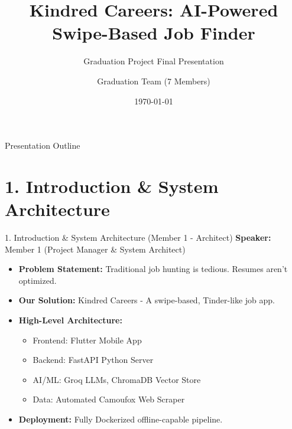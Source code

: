 \documentclass[aspectratio=169]{beamer}
\title[Kindred Careers]{Kindred Careers: AI-Powered Swipe-Based Job Finder}
\subtitle{Graduation Project Final Presentation}
\author[Graduation Team]{Graduation Team (7 Members)}
\institute[University]{Department of Computer Science}
\date{\today}
\begin{document}
\begin{frame}
    \titlepage
\end{frame}

\begin{frame}{Presentation Outline}
    \tableofcontents
\end{frame}

\section{1. Introduction \& System Architecture}
\begin{frame}{1. Introduction \& System Architecture (Member 1 - Architect)}
    \textbf{Speaker:} Member 1 (Project Manager \& System Architect)
    \vspace{0.5cm}
    \begin{itemize}
        \item \textbf{Problem Statement:} Traditional job hunting is tedious. Resumes aren't optimized.
        \item \textbf{Our Solution:} Kindred Careers - A swipe-based, Tinder-like job app.
        \item \textbf{High-Level Architecture:}
        \begin{itemize}
            \item Frontend: Flutter Mobile App
            \item Backend: FastAPI Python Server
            \item AI/ML: Groq LLMs, ChromaDB Vector Store
            \item Data: Automated Camoufox Web Scraper
        \end{itemize}
        \item \textbf{Deployment:} Fully Dockerized offline-capable pipeline.
    \end{itemize}
\end{frame}

\end{document}
